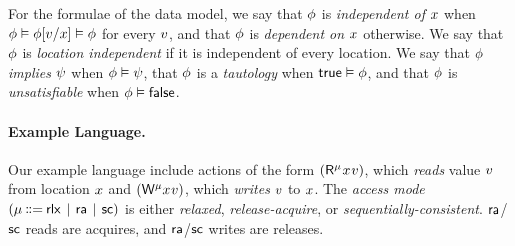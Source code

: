 
For the formulae of the data model,
we say that $\phi$ is \emph{independent of $x$} when
$\phi \vDash \phi[v/x] \vDash \phi$ for every $v$, and that
$\phi$ is \emph{dependent on $x$} otherwise.  We say that $\phi$ is
\emph{location independent} if it is independent of every location.
%
We say that $\phi$ \emph{implies} $\psi$ when $\phi\vDash\psi$,
that $\phi$ is a \emph{tautology} when $\mathsf{true}\vDash\phi$, and that
$\phi$ is \emph{unsatisfiable} when $\phi\vDash\mathsf{false}$.

\paragraph{Example Language.}
Our example language include actions of the form
$(\DR[\amode]{\aLoc}{\aVal})$, which \emph{reads} value $v$ from location
$x$ and $(\DW[\amode]{\aLoc}{\aVal})$, which \emph{writes} $v$ to
$x$.
The \emph{access mode} $(\amode \!\!\BNFDEF\!\! \modeRLX \!\BNFSEP\! \modeRA \!\BNFSEP\! \modeSC)$ is
either \emph{relaxed}, \emph{release-acquire}, or
\emph{sequentially-consistent}.
${\mathsf{ra}}$/${\mathsf{sc}}$ reads are acquires, and ${\mathsf{ra}}$/${\mathsf{sc}}$ writes are releases.

